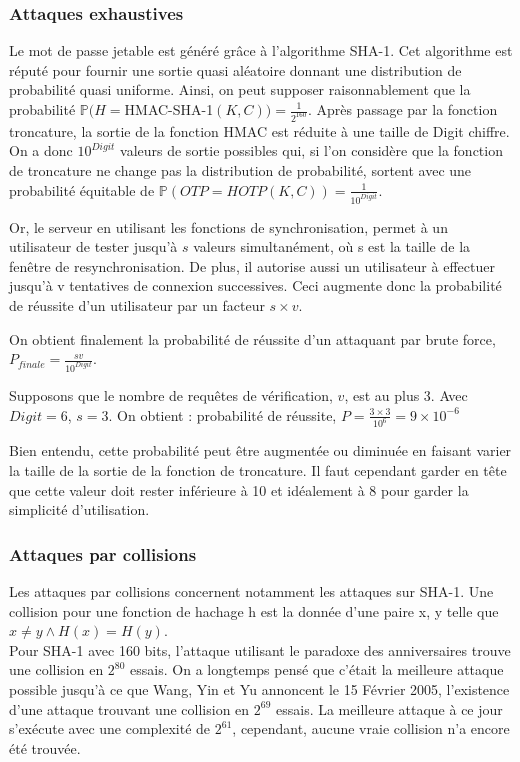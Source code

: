 \documentclass{../res/univ-projet}
\begin{document}
    \subsubsection{Attaques exhaustives}
    Le mot de passe jetable est généré grâce à l'algorithme SHA-1. Cet algorithme est réputé pour fournir une sortie quasi aléatoire donnant une distribution 
    de probabilité quasi uniforme. Ainsi, on peut supposer raisonnablement que la probabilité $\mathds{P}(H = $HMAC-SHA-1$(K, C)) = \frac{1}{2^{160}}$. 
    Après passage par la fonction troncature, la sortie de la fonction HMAC est réduite à une taille de Digit chiffre. On a donc $10^{Digit}$ valeurs de sortie 
    possibles qui, si l'on considère que la fonction de troncature ne change pas la distribution de probabilité, sortent avec une probabilité équitable de
    $\mathds{P}(OTP = HOTP(K, C)) = \frac{1}{10^{Digit}}$. 
    
    Or, le serveur en utilisant les fonctions de synchronisation, permet à un utilisateur de tester jusqu'à $s$ valeurs simultanément, où s est la taille de 
    la fenêtre de resynchronisation. De plus, il autorise aussi un utilisateur à effectuer jusqu'à v tentatives de connexion successives. Ceci augmente donc 
    la probabilité de réussite d'un utilisateur par un facteur $s \times v$.
    
    On obtient finalement la probabilité de réussite d'un attaquant par brute force, $P_{finale} = \frac{sv}{10^{Digit}}$.
   
    Supposons que le nombre de requêtes de vérification, $v$, est au plus 3.
    Avec $Digit = 6$, $s = 3$. On obtient : probabilité de réussite, $P =  \frac{3 \times 3}{10^6} = 9 \times 10^{-6}$
    
    Bien entendu, cette probabilité peut être augmentée ou diminuée en faisant varier la taille de la sortie de la fonction de troncature. Il faut cependant
    garder en tête que cette valeur doit rester inférieure à 10 et idéalement à 8 pour garder la simplicité d'utilisation.
    
    \subsubsection{Attaques par collisions}
    Les attaques par collisions concernent notamment les attaques sur SHA-1. Une collision pour une fonction de hachage h est la donnée d'une paire x, y telle 
    que $x \neq y \wedge H(x) = H(y)$.\\
    Pour SHA-1 avec 160 bits, l'attaque utilisant le paradoxe des anniversaires trouve une collision en $2^{80}$ essais. On a longtemps pensé que c'était 
    la meilleure attaque possible jusqu'à ce que Wang, Yin et Yu annoncent le 15 Février 2005, l'existence d'une attaque trouvant une collision en 
    $2^{69}$ essais. La meilleure attaque à ce jour s'exécute avec une complexité de $2^{61}$, cependant, aucune vraie collision n'a encore été trouvée.
    
\end{document}
